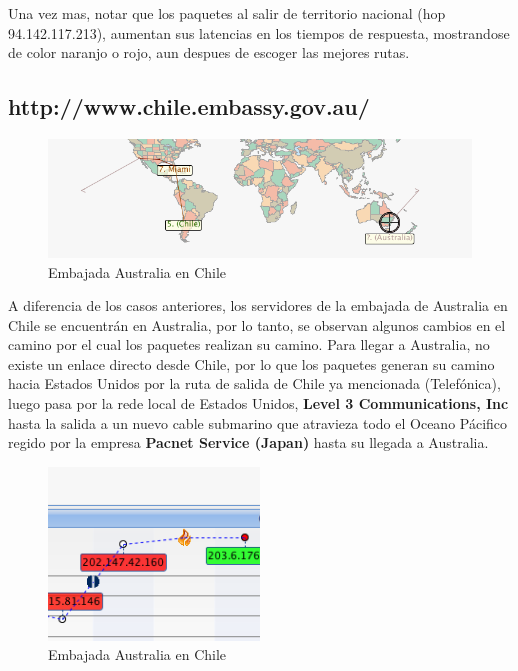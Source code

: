 \documentclass[a4papaer]{article}
\begin{document}
Una vez mas, notar que los paquetes al salir de territorio nacional (hop 94.142.117.213), aumentan sus latencias en los tiempos de respuesta, mostrandose de color naranjo o rojo, aun despues de escoger las mejores rutas.

\pagebreak

\subsection{http://www.chile.embassy.gov.au/}

\begin{figure}[h]
  \centering
    \includegraphics[width=1\textwidth]{au1}
  \caption{Embajada Australia en Chile}
  \label{fig:Trace Route de http://www.chile.embassy.gov.au/}
\end{figure}

A diferencia de los casos anteriores, los servidores de la embajada de Australia en Chile se encuentrán en Australia, por lo tanto, se observan algunos cambios en el camino por el cual los paquetes realizan su camino. Para llegar a Australia, no existe un enlace directo desde Chile, por lo que los paquetes generan su camino hacia Estados Unidos por la ruta de salida de Chile ya mencionada (Telefónica), luego pasa por la rede local de Estados Unidos, \textbf{Level 3 Communications, Inc} hasta la salida a un nuevo cable submarino que atravieza todo el Oceano Pácifico regido por la empresa \textbf{Pacnet Service (Japan)} hasta su llegada a Australia.

\begin{figure}[h]
  \centering
    \includegraphics[width=0.5\textwidth]{au4}
  \caption{Embajada Australia en Chile}
  \label{fig:Trace Route de http://www.chile.embassy.gov.au/}
\end{figure}
\end{document}
